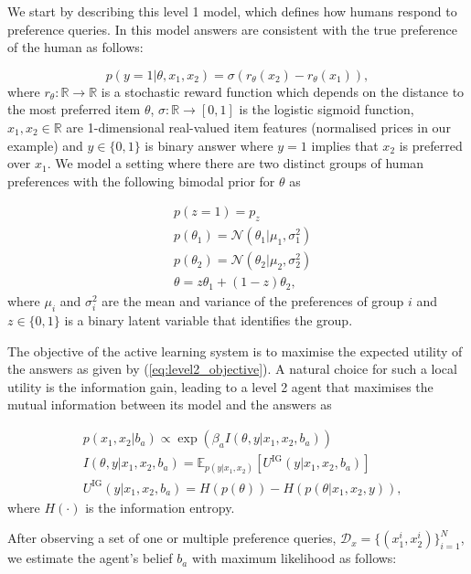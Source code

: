 \documentclass[letterpaper]{article} %
\begin{document}
We start by describing this level 1 model, which defines how humans respond to preference queries. In this model answers are consistent with the true preference of the human as follows:

\begin{equation}
    p(y=1 | \theta, x_1, x_2) = \sigma(r_{\theta}(x_2) - r_{\theta}(x_1)),
\end{equation}
where $r_{\theta} : \mathbb{R} \rightarrow \mathbb{R}$ is a stochastic reward function which depends on the distance to the most preferred item $\theta$, $\sigma : \mathbb{R} \rightarrow [0, 1]$ is the logistic sigmoid function, $x_1, x_2 \in \mathbb{R}$ are 1-dimensional real-valued item features (normalised prices in our example) and $y \in \{0,1\}$ is binary answer where $y=1$ implies that $x_2$ is preferred over $x_1$. We model a setting where there are two distinct groups of human preferences with the following bimodal prior for $\theta$ as

\begin{align}
    &p(z = 1) = p_z \\
    &p(\theta_1) =  \mathcal{N}(\theta_1 | \mu_1, \sigma_1^2) \\
    &p(\theta_2) =  \mathcal{N}(\theta_2 | \mu_2, \sigma_2^2) \\
    &\theta = z \theta_1 + (1 - z) \theta_2,
\end{align}
where $\mu_i$ and $\sigma^2_i$ are the mean and variance of the preferences of group $i$ and $z \in \{0, 1\}$ is a binary latent variable that identifies the group.

The objective of the active learning system is to maximise the expected utility of the answers as given by (\ref{eq:level2_objective}). A natural choice for such a local utility is the information gain, leading to a level 2 agent that maximises the mutual information between its model and the answers as

\begin{align}
    &p(x_1, x_2 | b_a) \propto \exp(\beta_a I(\theta, y | x_1, x_2, b_a)) \\
    &I(\theta, y | x_1, x_2, b_a) = \mathbb{E}_{p(y|x_1,x_2)}\left[U^{\text{IG}}(y| x_1, x_2, b_a)\right] \\
    &U^{\text{IG}}(y| x_1, x_2, b_a) = H(p(\theta)) - H(p(\theta | x_1, x_2, y)),
\end{align}
where $H(\cdot)$ is the information entropy.

After observing a set of one or multiple preference queries, $\mathcal{D}_x=\{(x_1^i, x_2^i)\}_{i=1}^N$, we estimate the agent's belief $b_a$ with maximum likelihood as follows:
\end{document}
